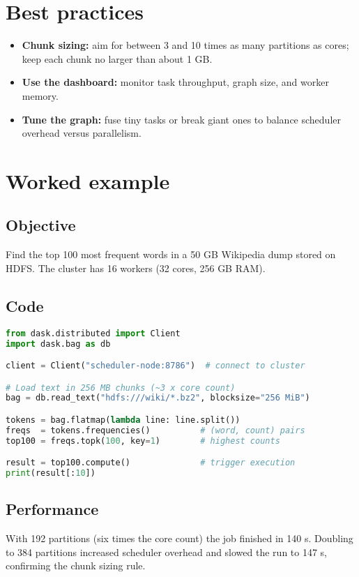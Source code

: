 \documentclass[11pt]{article}
\begin{document}
\section{Best practices}

\begin{itemize}[itemsep=2pt]
  \item \textbf{Chunk sizing:} aim for between 3 and 10 times as many partitions as cores; keep each chunk no larger than about 1 GB.
  \item \textbf{Use the dashboard:} monitor task throughput, graph size, and worker memory.
  \item \textbf{Tune the graph:} fuse tiny tasks or break giant ones to balance scheduler overhead versus parallelism.
\end{itemize}

\section{Worked example}

\subsection{Objective}
Find the top 100 most frequent words in a 50 GB Wikipedia dump stored on HDFS.  The cluster has 16 workers (32 cores, 256 GB RAM).

\subsection{Code}

\begin{lstlisting}[language=Python,caption={Distributed word count with Dask Bag}]
from dask.distributed import Client
import dask.bag as db

client = Client("scheduler-node:8786")  # connect to cluster

# Load text in 256 MB chunks (~3 x core count)
bag = db.read_text("hdfs:///wiki/*.bz2", blocksize="256 MiB")

tokens = bag.flatmap(lambda line: line.split())
freqs  = tokens.frequencies()          # (word, count) pairs
top100 = freqs.topk(100, key=1)        # highest counts

result = top100.compute()              # trigger execution
print(result[:10])
\end{lstlisting}

\subsection{Performance}
With 192 partitions (six times the core count) the job finished in 140 s.  
Doubling to 384 partitions increased scheduler overhead and slowed the run to 147 s, confirming the chunk sizing rule.
\end{document}
